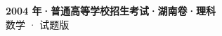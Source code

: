 \documentclass[zihao=-4, a4paper]{ctexart}
\begin{document}
\begin{center}
  {\Large\bfseries 2004 年·普通高等学校招生考试·湖南卷·理科}\\[4pt]
  {\large 数学 · 试题版}
\end{center}
\medskip
{}

\end{document}
